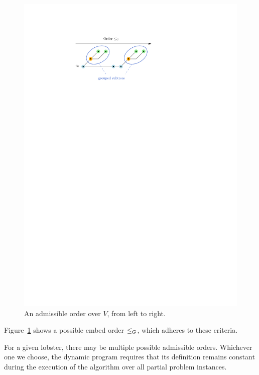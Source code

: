 \begin{figure}
    \centering
    \includegraphics{graphics/ch4_order.pdf}
    \caption{An admissible order over $V$, from left to right.}
    \label{fig:ch4-order}
\end{figure}

Figure~\ref{fig:ch4-order} shows a possible embed order $\leq_G$, which adheres to these criteria.

For a given lobster, there may be multiple possible admissible orders. Whichever one we choose, the dynamic program requires that its definition remains constant during the execution of the algorithm over all partial problem instances.

